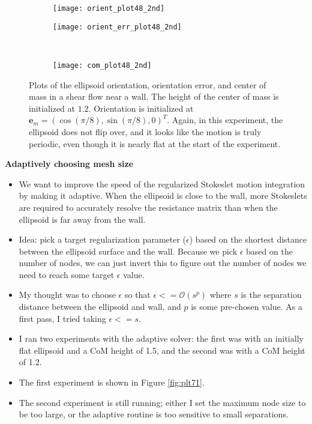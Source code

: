 \documentclass{article}
\newcommand{\vect}[1]{\boldsymbol{\mathbf{#1}}}
\begin{document}
\begin{figure}[h!]
  \centering
  \begin{subfigure}{0.49\textwidth}
    \texttt{[image: orient\_plot48\_2nd]}
  \end{subfigure}
  \hfill
  \begin{subfigure}{0.49\textwidth}
    \texttt{[image: orient\_err\_plot48\_2nd]}
  \end{subfigure}
  \\
  \begin{subfigure}{0.49\textwidth}
    \texttt{[image: com\_plot48\_2nd]}
  \end{subfigure}
  \caption{Plots of the ellipsoid orientation, orientation error, and
     center of mass in a shear flow near a wall. The height of the
     center of mass is initialized at $1.2$. Orientation is initialized
     at $\vect{e}_m = (\cos(\pi/8), \sin(\pi/8), 0)^T$. Again, in this
     experiment, the ellipsoid does not flip over, and it looks like
     the motion is truly periodic, even though it is nearly flat at
     the start of the experiment.}
  \label{fig:plt48}
\end{figure}

\newpage

{\large \textbf{Adaptively choosing mesh size}}

\begin{itemize}
\item We want to improve the speed of the regularized Stokeslet motion
  integration by making it adaptive. When the ellipsoid is close to
  the wall, more Stokeslets are required to accurately resolve the
  resistance matrix than when the ellipsoid is far away from the wall.
\item Idea: pick a target regularization parameter ($\epsilon$) based
  on the shortest distance between the ellipsoid surface and the
  wall. Because we pick $\epsilon$ based on the number of nodes, we
  can just invert this to figure out the number of nodes we need to
  reach some target $\epsilon$ value.
\item My thought was to choose $\epsilon$ so that
  $\epsilon <= \mathcal{O}(s^p)$ where $s$ is the separation distance
  between the ellipsoid and wall, and $p$ is some pre-chosen value. As
  a first pass, I tried taking $\epsilon <= s$.
\item I ran two experiments with the adaptive solver: the first was
  with an initially flat ellipsoid and a CoM height of 1.5, and the
  second was with a CoM height of 1.2.
\item The first experiment is shown in Figure \ref{fig:plt71}. 
\item The second experiment is still running; either I set the maximum
  node size to be too large, or the adaptive routine is too sensitive
  to small separations.
\end{itemize}
\end{document}

